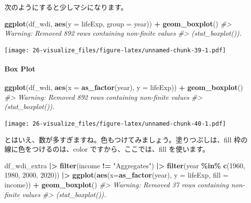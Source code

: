 \documentclass[
  xelatex, ja=standard]{bxjsbook}
\newenvironment{Shaded}{\begin{snugshade}}{\end{snugshade}}
\newcommand{\AttributeTok}[1]{\textcolor[rgb]{0.13,0.29,0.53}{#1}}
\newcommand{\CommentTok}[1]{\textcolor[rgb]{0.56,0.35,0.01}{\textit{#1}}}
\newcommand{\DecValTok}[1]{\textcolor[rgb]{0.00,0.00,0.81}{#1}}
\newcommand{\FunctionTok}[1]{\textcolor[rgb]{0.13,0.29,0.53}{\textbf{#1}}}
\newcommand{\NormalTok}[1]{#1}
\newcommand{\SpecialCharTok}[1]{\textcolor[rgb]{0.81,0.36,0.00}{\textbf{#1}}}
\newcommand{\StringTok}[1]{\textcolor[rgb]{0.31,0.60,0.02}{#1}}
\theoremstyle{definition}
\theoremstyle{definition}
\theoremstyle{definition}
\theoremstyle{definition}
\theoremstyle{remark}
\begin{document}
次のようにすると少しマシになります。

\begin{Shaded}
\begin{Highlighting}[]
\FunctionTok{ggplot}\NormalTok{(df\_wdi, }\FunctionTok{aes}\NormalTok{(}\AttributeTok{y =}\NormalTok{ lifeExp, }\AttributeTok{group =}\NormalTok{ year)) }\SpecialCharTok{+} \FunctionTok{geom\_boxplot}\NormalTok{()}
\CommentTok{\#\textgreater{} Warning: Removed 892 rows containing non{-}finite values}
\CommentTok{\#\textgreater{} (\textasciigrave{}stat\_boxplot()\textasciigrave{}).}
\end{Highlighting}
\end{Shaded}

\texttt{[image: 26-visualize\_files/figure-latex/unnamed-chunk-39-1.pdf]}

\hypertarget{box-plot}{%
\paragraph{Box Plot}\label{box-plot}}

\begin{Shaded}
\begin{Highlighting}[]
\FunctionTok{ggplot}\NormalTok{(df\_wdi, }\FunctionTok{aes}\NormalTok{(}\AttributeTok{x =} \FunctionTok{as\_factor}\NormalTok{(year), }\AttributeTok{y =}\NormalTok{ lifeExp)) }\SpecialCharTok{+} \FunctionTok{geom\_boxplot}\NormalTok{()}
\CommentTok{\#\textgreater{} Warning: Removed 892 rows containing non{-}finite values}
\CommentTok{\#\textgreater{} (\textasciigrave{}stat\_boxplot()\textasciigrave{}).}
\end{Highlighting}
\end{Shaded}

\texttt{[image: 26-visualize\_files/figure-latex/unnamed-chunk-40-1.pdf]}

とはいえ、数が多すぎますね。色もつけてみましょう。塗りつぶしは、fill 枠の線に色をつけるのは、color ですから、ここでは、fill を使います。

\begin{Shaded}
\begin{Highlighting}[]
\NormalTok{df\_wdi\_extra }\SpecialCharTok{|\textgreater{}} \FunctionTok{filter}\NormalTok{(income }\SpecialCharTok{!=} \StringTok{"Aggregates"}\NormalTok{) }\SpecialCharTok{|\textgreater{}} 
  \FunctionTok{filter}\NormalTok{(year }\SpecialCharTok{\%in\%} \FunctionTok{c}\NormalTok{(}\DecValTok{1960}\NormalTok{, }\DecValTok{1980}\NormalTok{, }\DecValTok{2000}\NormalTok{, }\DecValTok{2020}\NormalTok{)) }\SpecialCharTok{|\textgreater{}}
  \FunctionTok{ggplot}\NormalTok{(}\FunctionTok{aes}\NormalTok{(}\AttributeTok{x=}\FunctionTok{as\_factor}\NormalTok{(year), }\AttributeTok{y =}\NormalTok{ lifeExp, }\AttributeTok{fill =}\NormalTok{ income)) }\SpecialCharTok{+}
  \FunctionTok{geom\_boxplot}\NormalTok{()}
\CommentTok{\#\textgreater{} Warning: Removed 37 rows containing non{-}finite values}
\CommentTok{\#\textgreater{} (\textasciigrave{}stat\_boxplot()\textasciigrave{}).}
\end{Highlighting}
\end{Shaded}
\end{document}
